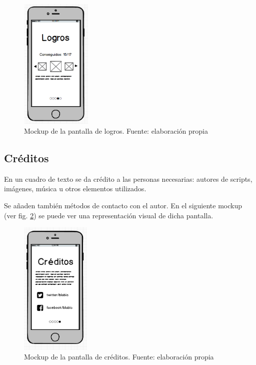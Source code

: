 \begin{figure}
    \begin{center}
 \includegraphics[width=1.35737in,height=2.49485in]{anexos/GDD/GDD-img003.png} 
    \caption{Mockup de la pantalla de logros. Fuente: elaboración propia}
    \label{mockupLogros}
    \end{center}

\end{figure}


\subsection[Cr\'editos]{ Cr\'editos}
\hypertarget{Toc484614218}{}{
En un cuadro de texto se da cr\'edito a las personas necesarias: autores de scripts, im\'agenes, m\'usica u otros
elementos utilizados.}

{
Se a\~naden tambi\'en m\'etodos de contacto con el autor. En el siguiente mockup (ver fig. \ref{mockupCreditos}) se puede ver una representaci\'on visual de dicha pantalla.}

\begin{figure}
    \begin{center}
\includegraphics[width=1.30933in,height=2.548in]{anexos/GDD/GDD-img004.png} 
    \caption{Mockup de la pantalla de créditos. Fuente: elaboración propia}
    \label{mockupCreditos}
    \end{center}

\end{figure}


